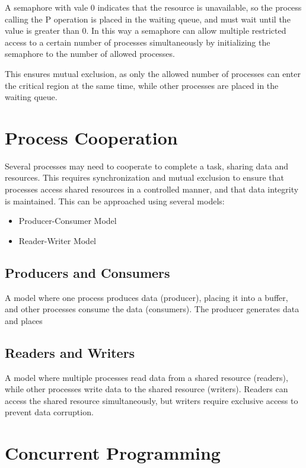 \documentclass[12pt letter]{report}
\begin{document}
A semaphore with vale 0 indicates that the resource is unavailable,
so the process calling the P operation is placed in the waiting
queue, and must wait until the value is greater than 0. In this way a
semaphore can allow multiple restricted access to a certain number of
processes simultaneously by initializing the semaphore to the number
of allowed processes.

This ensures mutual exclusion, as only the allowed number of processes can
enter the critical region at the same time, while other processes are
placed in the waiting queue.

\section{Process Cooperation}
Several processes may need to cooperate to complete a task, sharing data
and resources. This requires synchronization and mutual exclusion to
ensure that processes
access shared resources in a controlled manner, and that data integrity is
maintained. This can be approached using several models:
\begin{itemize}
  \item Producer-Consumer Model
  \item Reader-Writer Model
\end{itemize}

\subsection{Producers and Consumers}

A model where one process produces data (producer), placing it into a
buffer, and other processes
consume the data (consumers). The producer generates data and places

\subsection{Readers and Writers}

A model where multiple processes read data from a shared resource
(readers), while other processes write data to the shared resource
(writers). Readers can access the shared resource simultaneously,
but writers require exclusive access to prevent data corruption.

\section{Concurrent Programming}
\end{document}
